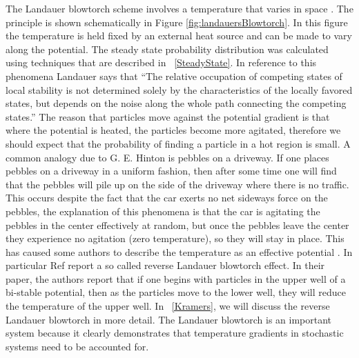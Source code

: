 The Landauer blowtorch scheme involves a temperature that varies in space \cite{Landauer1988}. The principle is shown schematically in Figure \ref{fig:landauersBlowtorch}. In this figure the temperature is held fixed by an external heat source and can be made to vary along the potential. The steady state probability distribution was calculated using techniques that are described in ~\autoref{SteadyState}. In reference to this phenomena Landauer says that \cite{Landauer1988}  ``The relative occupation of competing states of local stability is not determined solely by the characteristics of the locally favored states, but depends on the noise along the whole path connecting the competing states.'' The reason that particles move against the potential gradient is that where the potential is heated, the particles become more agitated, therefore we should expect that the probability of finding a particle in a hot region is small. A common analogy due to G. E. Hinton is pebbles on a driveway. If one places pebbles on a driveway in a uniform fashion, then after some time one will find that the pebbles will pile up on the side of the driveway where there is no traffic. This occurs despite the fact that the car exerts no net sideways force on the pebbles, the explanation of this phenomena is that the car is agitating the pebbles in the center effectively at random, but once the pebbles leave the center they experience no agitation (zero temperature), so they will stay in place. This has caused some authors to describe the temperature as an effective potential \cite{Gardiner2009, Kampen1988}. In particular Ref \cite{DasDasBarikEtAl2015} report a so called reverse Landauer blowtorch effect. In their paper, the authors report that if one begins with particles in the upper well of a bi-stable potential, then as the particles move to the lower well, they will reduce the temperature of the upper well. In ~\autoref{Kramers}, we will discuss the reverse Landauer blowtorch in more detail. The Landauer blowtorch is an important system because it clearly demonstrates that temperature gradients in stochastic systems need to be accounted for.

